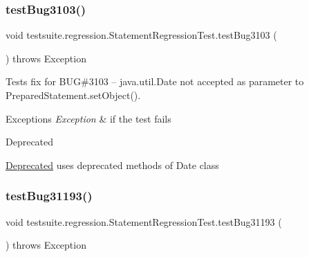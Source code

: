 \subsubsection{\texorpdfstring{test\+Bug3103()}{testBug3103()}}
{\footnotesize\ttfamily void testsuite.\+regression.\+Statement\+Regression\+Test.\+test\+Bug3103 (\begin{DoxyParamCaption}{ }\end{DoxyParamCaption}) throws Exception}

Tests fix for B\+UG\#3103 -- java.\+util.\+Date not accepted as parameter to Prepared\+Statement.\+set\+Object().


\begin{DoxyExceptions}{Exceptions}
{\em Exception} & if the test fails\\
\hline
\end{DoxyExceptions}
\begin{DoxyRefDesc}{Deprecated}
\item[\mbox{\hyperlink{deprecated__deprecated000007}{Deprecated}}]uses deprecated methods of Date class \end{DoxyRefDesc}
\mbox{\label{classtestsuite_1_1regression_1_1_statement_regression_test_acb243998243ec453cce2912cb437279a}} 
\subsubsection{\texorpdfstring{test\+Bug31193()}{testBug31193()}}
{\footnotesize\ttfamily void testsuite.\+regression.\+Statement\+Regression\+Test.\+test\+Bug31193 (\begin{DoxyParamCaption}{ }\end{DoxyParamCaption}) throws Exception}

\mbox{\label{classtestsuite_1_1regression_1_1_statement_regression_test_a46c9677cc1878bfd4f5da911d30cac02}} 
